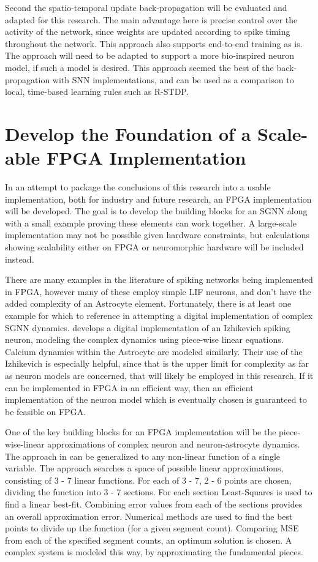     Second the spatio-temporal update back-propagation will be evaluated and adapted for this research. The main advantage here is precise control over the activity of the network, since weights are updated according to spike timing throughout the network. This approach also supports end-to-end training as is. The approach will need to be adapted to support a more bio-inspired neuron model, if such a model is desired. This approach seemed the best of the back-propagation with SNN implementations, and can be used as a comparison to local, time-based learning rules such as R-STDP.
    
    \section{Develop the Foundation of a Scale-able FPGA Implementation}
    In an attempt to package the conclusions of this research into a usable implementation, both for industry and future research, an FPGA implementation will be developed. The goal is to develop the building blocks for an SGNN along with a small example proving these elements can work together. A large-scale implementation may not be possible given hardware constraints, but calculations showing scalability either on FPGA or neuromorphic hardware will be included instead.
    
    There are many examples in the literature of spiking networks being implemented in FPGA, however many of these employ simple LIF neurons, and don't have the added complexity of an Astrocyte element. Fortunately, there is at least one example for which to reference in attempting a digital implementation of complex SGNN dynamics. \cite{fpga_sgnn} develops a digital implementation of an Izhikevich spiking neuron, modeling the complex dynamics using piece-wise linear equations. Calcium dynamics within the Astrocyte are modeled similarly. Their use of the Izhikevich is especially helpful, since that is the upper limit for complexity as far as neuron models are concerned, that will likely be employed in this research. If it can be implemented in FPGA in an efficient way, then an efficient implementation of the neuron model which is eventually chosen is guaranteed to be feasible on FPGA.
    
    One of the key building blocks for an FPGA implementation will be the piece-wise-linear approximations of complex neuron and neuron-astrocyte dynamics. The approach in \cite{fpga_sgnn} can be generalized to any non-linear function of a single variable. The approach searches a space of possible linear approximations, consisting of 3 - 7 linear functions. For each of 3 - 7, 2 - 6 points are chosen, dividing the function into 3 - 7 sections. For each section Least-Squares is used to find a linear best-fit. Combining error values from each of the sections provides an overall approximation error. Numerical methods are used to find the best points to divide up the function (for a given segment count). Comparing MSE from each of the specified segment counts, an optimum solution is chosen. A complex system is modeled this way, by approximating the fundamental pieces.
    
